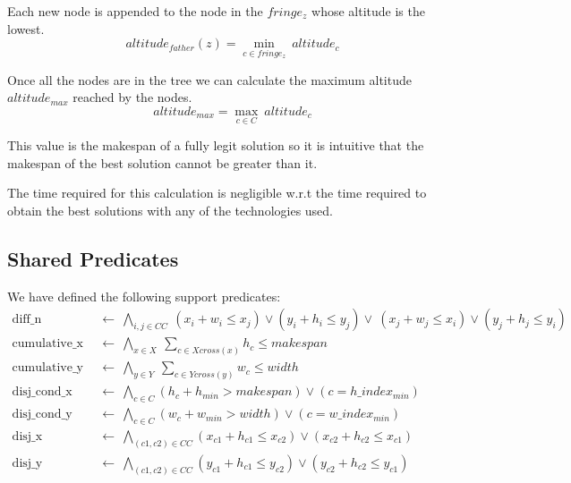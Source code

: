         Each new node is appended to the node in the \(fringe_z\) whose altitude is the lowest.
        \begin{equation*}
            altitude_{father}(z) = \min_{c \in fringe_z}\ {altitude_c} 
        \end{equation*}

        Once all the nodes are in the tree we can calculate the maximum altitude $altitude_{max}$ reached by the nodes.
        \begin{equation*}
            altitude_{max} = \max_{c \in C}\  altitude_c
        \end{equation*}

        This value is the makespan of a fully legit solution so it is intuitive that the makespan of the best solution cannot
        be greater than it. 
        
        The time required for this calculation is negligible w.r.t the time required to obtain the best solutions with any 
        of the technologies used.



\subsection{Shared Predicates} \label{sec:shared_predicates}
    We have defined the following support predicates:
    \begin{align}
              \text{diff\_n}\ &\ \leftarrow\ \bigwedge_{i,j \in CC}\ (x_i + w_i \leq x_j) \lor (y_i + h_i \leq y_j) \lor\ (x_j + w_j \leq x_i) \lor (y_j + h_j \leq y_i) \label{eq:diffn}        \\
        \text{cumulative\_x}\ &\ \leftarrow\ \bigwedge_{x \in X}\ \sum_{c \in Xcross(x)} h_c \leq makespan                                                               \label{eq:cumulative_x} \\
        \text{cumulative\_y}\ &\ \leftarrow\ \bigwedge_{y \in Y}\ \sum_{c \in Ycross(y)} w_c \leq width                                                                  \label{eq:cumulative_y} \\
        \text{disj\_cond\_x}\ &\ \leftarrow\ \bigwedge_{c \in C} (h_c + h_{min} > makespan) \lor (c = h\_index_{min})                                                    \nonumber \\
        \text{disj\_cond\_y}\ &\ \leftarrow\ \bigwedge_{c \in C} (w_c + w_{min} > width) \lor (c = w\_index_{min})                                                       \nonumber \\
              \text{disj\_x}\ &\ \leftarrow\ \bigwedge_{(c1,c2) \in CC} (x_{c1} + h_{c1} \leq x_{c2}) \lor (x_{c2} + h_{c2} \leq x_{c1})                                 \nonumber \\
              \text{disj\_y}\ &\ \leftarrow\ \bigwedge_{(c1,c2) \in CC} (y_{c1} + h_{c1} \leq y_{c2}) \lor (y_{c2} + h_{c2} \leq y_{c1})                                 \nonumber
    \end{align}


